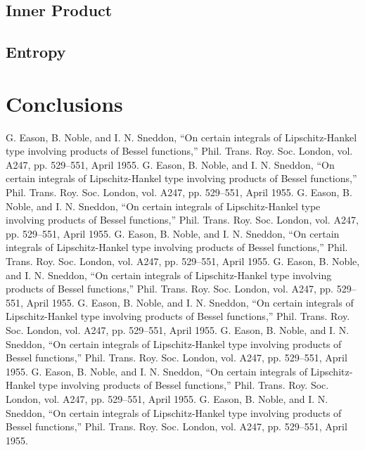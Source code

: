 \documentclass[10pt, conference]{IEEEtran}
\begin{document}
\subsection{Inner Product}
\subsection{Entropy}

\section{Conclusions}

\begin{thebibliography}{00}
 G. Eason, B. Noble, and I. N. Sneddon, ``On certain integrals of Lipschitz-Hankel type involving products of Bessel functions,'' Phil. Trans. Roy. Soc. London, vol. A247, pp. 529--551, April 1955.
 G. Eason, B. Noble, and I. N. Sneddon, ``On certain integrals of Lipschitz-Hankel type involving products of Bessel functions,'' Phil. Trans. Roy. Soc. London, vol. A247, pp. 529--551, April 1955.
 G. Eason, B. Noble, and I. N. Sneddon, ``On certain integrals of Lipschitz-Hankel type involving products of Bessel functions,'' Phil. Trans. Roy. Soc. London, vol. A247, pp. 529--551, April 1955.
 G. Eason, B. Noble, and I. N. Sneddon, ``On certain integrals of Lipschitz-Hankel type involving products of Bessel functions,'' Phil. Trans. Roy. Soc. London, vol. A247, pp. 529--551, April 1955.
 G. Eason, B. Noble, and I. N. Sneddon, ``On certain integrals of Lipschitz-Hankel type involving products of Bessel functions,'' Phil. Trans. Roy. Soc. London, vol. A247, pp. 529--551, April 1955.
 G. Eason, B. Noble, and I. N. Sneddon, ``On certain integrals of Lipschitz-Hankel type involving products of Bessel functions,'' Phil. Trans. Roy. Soc. London, vol. A247, pp. 529--551, April 1955.
 G. Eason, B. Noble, and I. N. Sneddon, ``On certain integrals of Lipschitz-Hankel type involving products of Bessel functions,'' Phil. Trans. Roy. Soc. London, vol. A247, pp. 529--551, April 1955.
 G. Eason, B. Noble, and I. N. Sneddon, ``On certain integrals of Lipschitz-Hankel type involving products of Bessel functions,'' Phil. Trans. Roy. Soc. London, vol. A247, pp. 529--551, April 1955.
 G. Eason, B. Noble, and I. N. Sneddon, ``On certain integrals of Lipschitz-Hankel type involving products of Bessel functions,'' Phil. Trans. Roy. Soc. London, vol. A247, pp. 529--551, April 1955.

\end{thebibliography}
\end{document}
